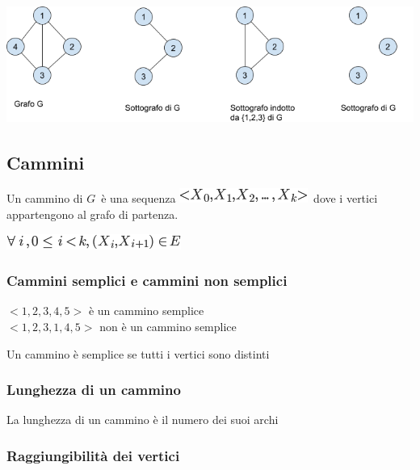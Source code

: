 \documentclass{article}
\begin{document}
\subsection{\texorpdfstring{{\protect\includegraphics{images/image534.png}}}{}}\label{h.alw0becdzne2}

\hypertarget{h.lxvflhr4q9d8}{\subsection{\texorpdfstring{{Cammini}}{Cammini}}\label{h.lxvflhr4q9d8}}

{Un cammino di }$G${~è una sequenza
}\includegraphics{images/image347.png}{~dove i vertici appartengono al
grafo di partenza. }

\includegraphics{images/image348.png}

\hypertarget{h.sjz08mn040is}{\subsubsection{\texorpdfstring{{Cammini
semplici e cammini non
semplici}}{Cammini semplici e cammini non semplici}}\label{h.sjz08mn040is}}


$<1,2,3,4,5>$ è un cammino semplice\\
$<1,2,3,1,4,5>$ non è un cammino semplice

{Un cammino è semplice se tutti i vertici sono distinti}

\hypertarget{h.e18ltelmo48z}{\subsubsection{\texorpdfstring{{Lunghezza
di un cammino}}{Lunghezza di un cammino}}\label{h.e18ltelmo48z}}

{La lunghezza di un cammino è il numero dei suoi archi}

\hypertarget{h.4bm9pdnjdb2q}{\subsubsection{\texorpdfstring{{Raggiungibilità
dei vertici}}{Raggiungibilità dei vertici}}\label{h.4bm9pdnjdb2q}}
\end{document}

